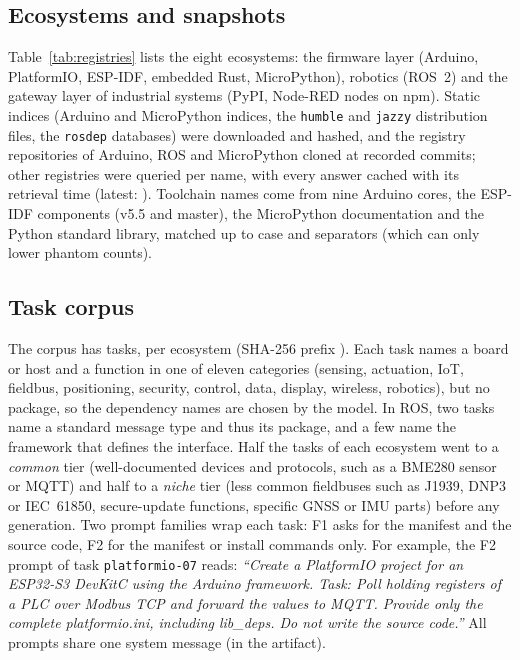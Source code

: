 \documentclass[conference]{IEEEtran}
\newcommand{\sest}{\mathsf{est}}
\begin{document}
\subsection{Ecosystems and snapshots}
Table~\ref{tab:registries} lists the eight ecosystems: the firmware layer (Arduino, PlatformIO, ESP-IDF, embedded
Rust, MicroPython), robotics (ROS~2) and the gateway layer of industrial systems (PyPI, Node-RED nodes on npm). Static
indices (Arduino and MicroPython indices, the \texttt{humble} and \texttt{jazzy} distribution files, the
\texttt{rosdep} databases) were downloaded and hashed, and the registry repositories of Arduino, ROS and MicroPython
cloned at recorded commits; other registries were queried per name, with every answer cached with its retrieval time
(latest: \rSnapshotDate). Toolchain names come from nine Arduino cores, the ESP-IDF components (v5.5 and master), the
MicroPython documentation and the Python standard library, matched up to case and separators (which can only
lower phantom counts).

\begin{table}[t]
\centering
\caption{Ecosystems: how a name enters the registry, source of the record-date bounds, digest locking, resolved
declarations with a decidable $\sest$, and decisions of rule (\ref{eq:rule}) on clean manifests
(Section~\ref{sec:gateeval}) per task ecosystem (A admit, ? review or request, X reject).}
\label{tab:registries}
\footnotesize
\setlength{\tabcolsep}{2.5pt}

\end{table}

\subsection{Task corpus}
The corpus has \rNTasks{} tasks, \rTasksPerEco{} per ecosystem (SHA-256 prefix \texttt{\rCorpusSha}). Each task names a board or
host and a function in one of eleven categories (sensing, actuation, IoT, fieldbus, positioning, security, control,
data, display, wireless, robotics), but no package, so the dependency names are chosen by the model. In ROS, two
tasks name a standard message type and thus its package, and a few name the framework that defines the interface.
Half the tasks of each ecosystem went to a \emph{common} tier (well-documented devices and protocols, such as
a BME280 sensor or MQTT) and half to a \emph{niche} tier (less common fieldbuses such as J1939, DNP3 or IEC~61850,
secure-update functions, specific GNSS or IMU parts) before any generation. Two prompt families wrap each task: F1
asks for the manifest and the source code, F2 for the manifest or install commands only. For example, the F2 prompt of
task \texttt{platformio-07} reads: \emph{``Create a PlatformIO project for an ESP32-S3 DevKitC using the Arduino
framework. Task: Poll holding registers of a PLC over Modbus TCP and forward the values to MQTT. Provide only the
complete platformio.ini, including lib\_deps. Do not write the source code.''} All prompts share one system message
(in the artifact).
\end{document}
